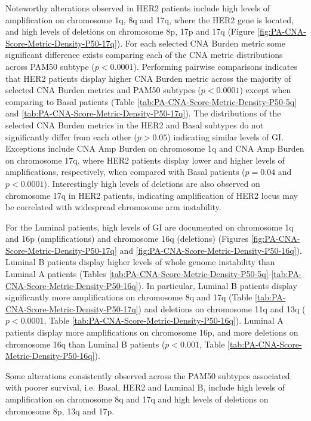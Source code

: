 Noteworthy alterations observed in HER2 patients include high levels of amplification on chromosome 1q, 8q and 17q, where the HER2 gene is located, and high levels of deletions on chromosome 8p, 17p and 17q (Figure \ref{fig:PA-CNA-Score-Metric-Density-P50-17q}). For each selected CNA Burden metric some significant difference exists comparing each of the CNA metric distributions across PAM50 subtype ($p<0.0001$). Performing pairwise comparisons indicates that HER2 patients display higher CNA Burden metric across the majority of selected CNA Burden metrics and PAM50 subtypes ($p<0.0001$) except when comparing to Basal patients (Table \ref{tab:PA-CNA-Score-Metric-Density-P50-5q} and \ref{tab:PA-CNA-Score-Metric-Density-P50-17q}). The distributions of the selected CNA Burden metrics in the HER2 and Basal subtypes do not significantly differ from each other ($p>0.05$) indicating similar levels of GI. Exceptions include CNA Amp Burden on chromosome 1q and CNA Amp Burden on chromosome 17q, where HER2 patients display lower and higher levels of amplifications, respectively, when compared with Basal patients ($p = 0.04$ and  $p<0.0001$). Interestingly high levels of deletions are also observed on chromosome 17q in HER2 patients, indicating amplification of HER2 locus may be correlated with widespread chromosome arm instability. 

For the Luminal patients, high levels of GI are documented on chromosome 1q and 16p (amplifications) and chromosome 16q (deletions) (Figures \ref{fig:PA-CNA-Score-Metric-Density-P50-17q} and \ref{fig:PA-CNA-Score-Metric-Density-P50-16q}). Luminal B patients display higher levels of whole genome instability than Luminal A patients (Tables \ref{tab:PA-CNA-Score-Metric-Density-P50-5q}-\ref{tab:PA-CNA-Score-Metric-Density-P50-16q}). In particular, Luminal B patients display significantly more amplifications on chromosome 8q and 17q (Table \ref{tab:PA-CNA-Score-Metric-Density-P50-17q}) and deletions on chromosome 11q and 13q ($p < 0.0001$, Table \ref{tab:PA-CNA-Score-Metric-Density-P50-16q}). Luminal A patients display more amplifications on chromosome 16p, and more deletions on chromosome 16q than Luminal B patients ($p<0.001$, Table \ref{tab:PA-CNA-Score-Metric-Density-P50-16q}). 

Some alterations consistently observed across the PAM50 subtypes associated with poorer survival, i.e. Basal, HER2 and Luminal B, include high levels of amplification on chromosome 8q and 17q and high levels of deletions on chromosome 8p, 13q and 17p. 

